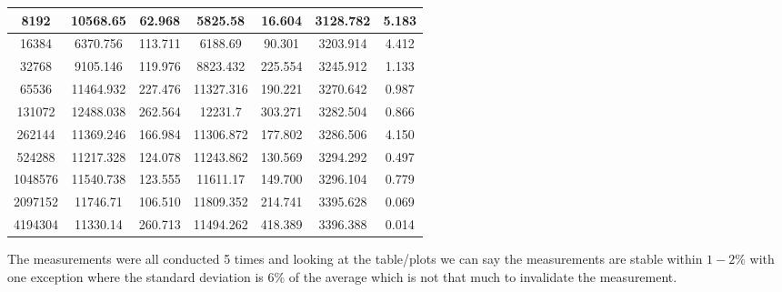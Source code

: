 \documentclass[UTF-8]{article}
\begin{document}
\begin{table}
\begin{tabular}{|c|c|c|c|c|c|c|}
		\hline
		8192    & 10568.65    & 62.968       & 5825.58        & 16.604          & 3128.782      & 5.183           \\ 
		\hline
		16384   & 6370.756    & 113.711      & 6188.69        & 90.301          & 3203.914      & 4.412           \\ 
		\hline
		32768   & 9105.146    & 119.976      & 8823.432       & 225.554         & 3245.912      & 1.133           \\ 
		\hline
		65536   & 11464.932   & 227.476      & 11327.316      & 190.221         & 3270.642      & 0.987           \\ 
		\hline
		131072  & 12488.038   & 262.564      & 12231.7        & 303.271         & 3282.504      & 0.866           \\ 
		\hline
		262144  & 11369.246   & 166.984      & 11306.872      & 177.802         & 3286.506      & 4.150           \\ 
		\hline
		524288  & 11217.328   & 124.078      & 11243.862      & 130.569         & 3294.292      & 0.497           \\ 
		\hline
		1048576 & 11540.738   & 123.555      & 11611.17       & 149.700         & 3296.104      & 0.779           \\ 
		\hline
		2097152 & 11746.71    & 106.510      & 11809.352      & 214.741         & 3395.628      & 0.069           \\ 
		\hline
		4194304 & 11330.14    & 260.713      & 11494.262      & 418.389         & 3396.388      & 0.014           \\
		\hline
	\end{tabular}
\end{table}

The measurements were all conducted 5 times and looking at the table/plots we can say the measurements are stable within $1-2 \%$ with one exception where the standard deviation is 6\% of the average which is not that much to invalidate the measurement.
\end{document}
